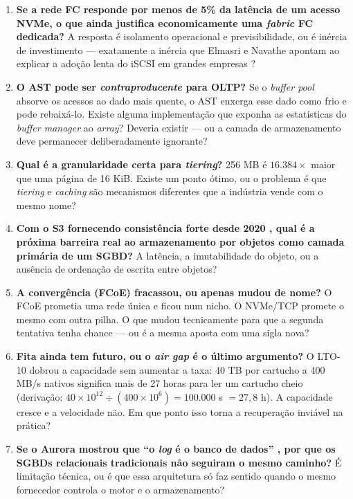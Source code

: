 \documentclass[11pt,a4paper]{article}
\begin{document}
\begin{enumerate}[leftmargin=0.9cm,itemsep=4pt]

\item \textbf{Se a rede FC responde por menos de 5\% da latência de um acesso NVMe, o que ainda
justifica economicamente uma \textit{fabric} FC dedicada?} A resposta é isolamento operacional e
previsibilidade, ou é inércia de investimento --- exatamente a inércia que Elmasri e Navathe
apontam ao explicar a adoção lenta do iSCSI em grandes empresas \cite{elmasri2018}?

\item \textbf{O AST pode ser \emph{contraproducente} para OLTP?} Se o \textit{buffer pool} absorve
os acessos ao dado mais quente, o AST enxerga esse dado como frio e pode rebaixá-lo. Existe alguma
implementação que exponha as estatísticas do \textit{buffer manager} ao \textit{array}? Deveria
existir --- ou a camada de armazenamento deve permanecer deliberadamente ignorante?

\item \textbf{Qual é a granularidade certa para \textit{tiering}?} 256 MB \cite{dellfast} é
$16.384\times$ maior que uma página de 16 KiB. Existe um ponto ótimo, ou o problema é que
\textit{tiering} e \textit{caching} são mecanismos diferentes que a indústria vende com o mesmo
nome?

\item \textbf{Com o S3 fornecendo consistência forte desde 2020 \cite{awss3faq}, qual é a próxima
barreira real ao armazenamento por objetos como camada primária de um SGBD?} A latência, a
imutabilidade do objeto, ou a ausência de ordenação de escrita entre objetos?

\item \textbf{A convergência (FCoE) fracassou, ou apenas mudou de nome?} O FCoE prometia uma rede
única e ficou num nicho. O NVMe/TCP promete o mesmo com outra pilha. O que mudou tecnicamente para
que a segunda tentativa tenha chance --- ou é a mesma aposta com uma sigla nova?

\item \textbf{Fita ainda tem futuro, ou o \textit{air gap} é o último argumento?} O LTO-10 dobrou a
capacidade sem aumentar a taxa: 40 TB por cartucho a 400 MB/s nativos \cite{lto10} significa mais de
27 horas para ler um cartucho cheio (derivação: $40 \times 10^{12} \div (400 \times 10^{6}) =
100.000$ s $= 27{,}8$ h). A capacidade cresce e a velocidade não. Em que ponto isso torna a
recuperação inviável na prática?

\item \textbf{Se o Aurora mostrou que ``o \textit{log} é o banco de dados'' \cite{aurora2017}, por
que os SGBDs relacionais tradicionais não seguiram o mesmo caminho?} É limitação técnica, ou é que
essa arquitetura só faz sentido quando o mesmo fornecedor controla o motor e o armazenamento?

\end{enumerate}
\end{document}
